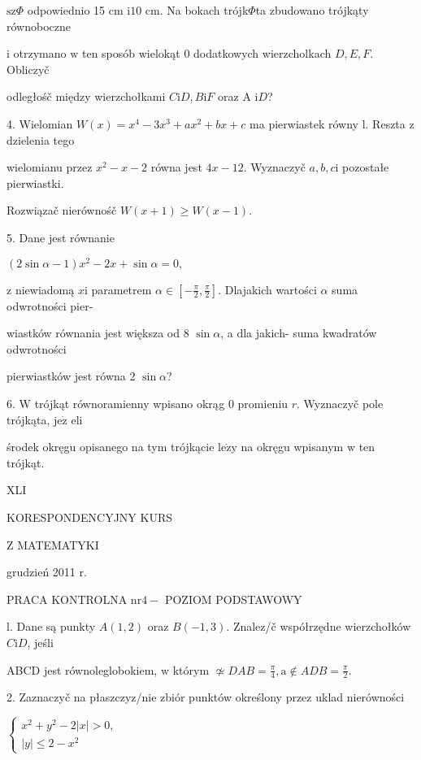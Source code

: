 \documentclass[a4paper,12pt]{article}
\begin{document}
$\mathrm{s}\mathrm{z}\Phi$ odpowiednio 15 cm $\mathrm{i}10$ cm. Na bokach trójk$\Phi$ta zbudowano trójkąty równoboczne

$\mathrm{i}$ otrzymano $\mathrm{w}$ ten sposób wielokąt $0$ dodatkowych wierzcholkach $D, E, F$. Obliczyč

odległośč między wierzchołkami $C\mathrm{i}D, B\mathrm{i}F$ oraz A $\mathrm{i}D$?

4. Wielomian $W(x)=x^{4}-3x^{3}+ax^{2}+bx+c$ ma pierwiastek równy l. Reszta $\mathrm{z}$ dzielenia tego

wielomianu przez $x^{2}-x-2$ równa jest $4x-12$. Wyznaczyč $a, b, c\mathrm{i}$ pozostałe pierwiastki.

Rozwiązač nierównośč $W(x+1)\geq W(x-1).$

5. Dane jest równanie

$(2\sin\alpha-1)x^{2}-2x+\sin\alpha=0,$

$\mathrm{z}$ niewiadomą $x\mathrm{i}$ parametrem $\alpha\in [-\displaystyle \frac{\pi}{2},\frac{\pi}{2}]$. Dlajakich wartości $\alpha$ suma odwrotności pier-

wiastków równania jest większa od 8 $\sin\alpha$, a dla jakich- suma kwadratów odwrotności

pierwiastków jest równa 2 $\sin\alpha$?

6. $\mathrm{W}$ trójkąt równoramienny wpisano okrąg $0$ promieniu $r$. Wyznaczyč pole trójkąta, $\mathrm{j}\mathrm{e}\dot{\mathrm{z}}$ eli

środek okręgu opisanego na tym trójkącie $\mathrm{l}\mathrm{e}\dot{\mathrm{z}}\mathrm{y}$ na okręgu wpisanym $\mathrm{w}$ ten trójkąt.





XLI

KORESPONDENCYJNY KURS

Z MATEMATYKI

grudzień 2011 r.

PRACA KONTROLNA $\mathrm{n}\mathrm{r} 4-$ POZIOM PODSTAWOWY

l. Dane są punkty $A(1,2)$ oraz $B(-1,3)$. Znalez/č współrzędne wierzchołków $C\mathrm{i}D$, jeśli

ABCD jest równoleglobokiem, $\mathrm{w}$ którym $\displaystyle \not\simeq DAB=\frac{\pi}{4}, \displaystyle \mathrm{a}\not\in ADB=\frac{\pi}{2}.$

2. Zaznaczyč na płaszczyz/nie zbiór punktów określony przez uklad nierówności

$\left\{\begin{array}{l}
x^{2}+y^{2}-2|x|>0,\\
|y|\leq 2-x^{2}
\end{array}\right.$
\end{document}
